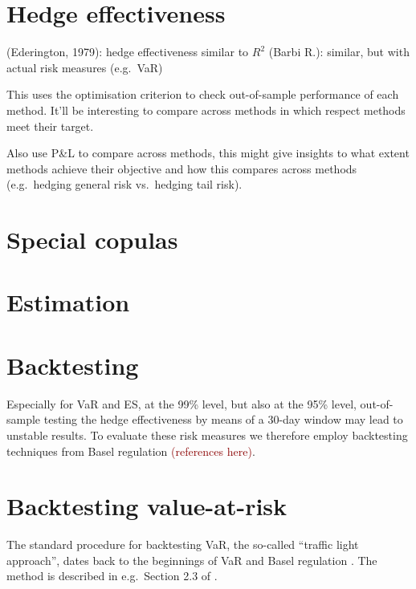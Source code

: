 \documentclass[square]{article} %
\providecommand{\natp}[1]{\textcolor{darkred}{#1}}
\theoremstyle{plain}
\theoremstyle{definition} %
\begin{document}
\section{Hedge effectiveness}
\label{sec:hedge-effectiveness}

(Ederington, 1979): hedge effectiveness similar to $R^2$
(Barbi R.): similar, but with actual risk measures (e.g.\ VaR)

This uses the optimisation criterion to check out-of-sample
performance of each method. It'll be interesting to compare across
methods in which respect methods meet their target.

Also use P\&L to compare across methods, this might give insights to
what extent methods achieve their objective and how this compares
across methods (e.g.\ hedging general risk vs.\ hedging tail risk). 

%


\section{Special copulas}
\label{sec:dependence}


\clearpage
\section{Estimation}


\clearpage

\section{Backtesting}
\label{sec:backtesting}

Especially for VaR and ES, at the 99\% level, but also at the 95\%
level, out-of-sample testing the hedge effectiveness by means of a
30-day window may lead to unstable results. To evaluate these risk
measures we therefore employ backtesting techniques from Basel
regulation \natp{(references here)}.

\section{Backtesting value-at-risk}
\label{sec:backtesting-value-at}

The standard procedure for backtesting VaR, the so-called ``traffic
light approach'', dates back to the beginnings of VaR and Basel
regulation \cite{Basel1996b}. The method is described in e.g.\ Section
2.3 of \cite{McNeil2005}.
\end{document}
